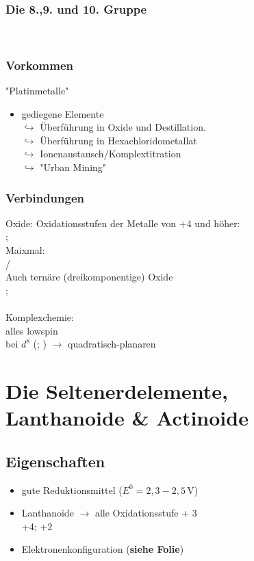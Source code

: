 \documentclass[a4paper, fleqn]{article}
\begin{document}
\subsubsection{Die 8.,9. und 10. Gruppe}
\\
\subsubsection{Vorkommen}
"Platinmetalle"\\
\begin{itemize}
    \item gediegene Elemente\\ $\hookrightarrow$ Überführung in Oxide und Destillation.\\$\hookrightarrow$ Überführung in Hexachloridometallat\\$\hookrightarrow$ Ionenaustausch/Komplextitration\\$\hookrightarrow$ "Urban Mining"
\end{itemize}
\subsubsection{Verbindungen}
Oxide: Oxidationsstufen der Metalle von +4 und höher:\\
; \\
Maixmal:\\
 / \\
Auch ternäre (dreikomponentige) Oxide\\
; \\\\
Komplexchemie:\\
alles lowspin\\
bei $d^8$ (; ) $\rightarrow$ quadratisch-planaren

\section{Die Seltenerdelemente, Lanthanoide \& Actinoide}
\subsection{Eigenschaften}
\begin{itemize}
    \item gute Reduktionsmittel ($E^0 = 2,3-2,5\,\mathrm{V}$)
    \item Lanthanoide $\rightarrow$ alle Oxidationsstufe + 3\\  +4;  +2
    \item Elektronenkonfiguration (\textbf{siehe Folie})
\end{itemize}
\end{document}
